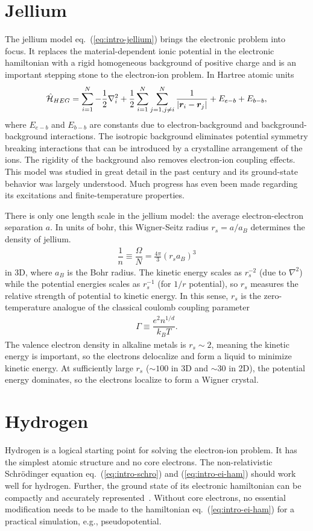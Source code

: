 \section{Jellium}
The jellium model eq.~(\ref{eq:intro-jellium}) brings the electronic problem into focus. It replaces the material-dependent ionic potential in the electronic hamiltonian with a rigid homogeneous background of positive charge and is an important stepping stone to the electron-ion problem. In Hartree atomic units
\begin{align} \label{eq:intro-jellium}
\hat{\mathcal{H}}_{HEG} = \sum\limits_{i=1}^N -\dfrac{1}{2}\nabla_i^2 + \frac{1}{2}\sum\limits_{i=1}^N\sum\limits_{j=1,j\neq i}^N
\dfrac{1}{\vert \boldsymbol{r}_i-\boldsymbol{r}_j \vert}
+E_{e-b}+E_{b-b},
\end{align}
where $E_{e-b}$ and $E_{b-b}$ are constants due to electron-background and background-background interactions. The isotropic background eliminates potential symmetry breaking interactions that can be introduced by a crystalline arrangement of the ions. The rigidity of the background also removes electron-ion coupling effects. This model was studied in great detail in the past century and its ground-state behavior was largely understood. Much progress has even been made regarding its excitations and finite-temperature properties.

There is only one length scale in the jellium model: the average electron-electron separation $a$. In units of bohr, this Wigner-Seitz radius $r_s=a/a_B$ determines the density of jellium.
\begin{align}
\dfrac{1}{n} \equiv \dfrac{\Omega}{N} = \frac{4\pi}{3}(r_sa_B)^3
\end{align}
in 3D, where $a_B$ is the Bohr radius. The kinetic energy scales as $r_s^{-2}$ (due to $\nabla^2$) while the potential energies scales as $r_s^{-1}$ (for $1/r$ potential), so $r_s$ measures the relative strength of potential to kinetic energy. In this sense, $r_s$ is the zero-temperature analogue of the classical coulomb coupling parameter
\begin{align}
\Gamma \equiv \dfrac{e^2n^{1/d}}{k_BT}.
\end{align}
The valence electron density in alkaline metals is $r_s\sim2$, meaning the kinetic energy is important, so the electrons delocalize and form a liquid to minimize kinetic energy. At sufficiently large $r_s$ ($\sim 100$ in 3D and $\sim 30$ in 2D), the potential energy dominates, so the electrons localize to form a Wigner crystal.

\section{Hydrogen}
Hydrogen is a logical starting point for solving the electron-ion problem.
It has the simplest atomic structure and no core electrons.
The non-relativistic Schr\"odinger equation eq.~(\ref{eq:intro-schro}) and (\ref{eq:intro-ei-ham}) should work well for hydrogen. Further, the ground state of its electronic hamiltonian can be compactly and accurately represented~\cite{Holzmann2003}.
Without core electrons, no essential modification needs to be made to the hamiltonian eq.~(\ref{eq:intro-ei-ham}) for a practical simulation, e.g., pseudopotential.

